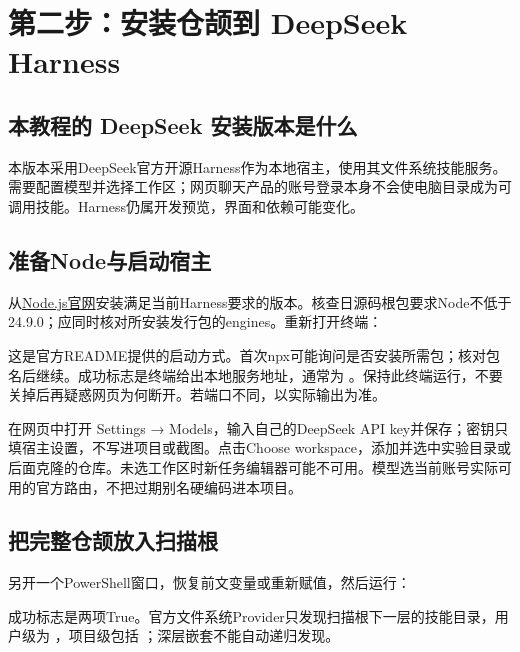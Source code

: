 \def\HostName{DeepSeek Harness}


\section{第二步：安装仓颉到 DeepSeek Harness}
\subsection{本教程的 DeepSeek 安装版本是什么}
本版本采用DeepSeek官方开源Harness作为本地宿主，使用其文件系统技能服务。需要配置模型并选择工作区；网页聊天产品的账号登录本身不会使电脑目录成为可调用技能。Harness仍属开发预览，界面和依赖可能变化\cite{dshreadme}。

\subsection{准备Node与启动宿主}
从\href{https://nodejs.org/}{Node.js官网}安装满足当前Harness要求的版本。核查日源码根包要求Node不低于24.9.0；应同时核对所安装发行包的engines。重新打开终端：
这是官方README提供的启动方式\cite{dshreadme}。首次npx可能询问是否安装所需包；核对包名后继续。成功标志是终端给出本地服务地址，通常为 。保持此终端运行，不要关掉后再疑惑网页为何断开。若端口不同，以实际输出为准。

在网页中打开 Settings → Models，输入自己的DeepSeek API key并保存；密钥只填宿主设置，不写进项目或截图。点击Choose workspace，添加并选中实验目录或后面克隆的仓库。未选工作区时新任务编辑器可能不可用\cite{dshweb}。模型选当前账号实际可用的官方路由，不把过期别名硬编码进本项目。

\subsection{把完整仓颉放入扫描根}
另开一个PowerShell窗口，恢复前文变量或重新赋值，然后运行：
成功标志是两项True。官方文件系统Provider只发现扫描根下一层的技能目录，用户级为 ，项目级包括 ；深层嵌套不能自动递归发现\cite{dshskills}。

